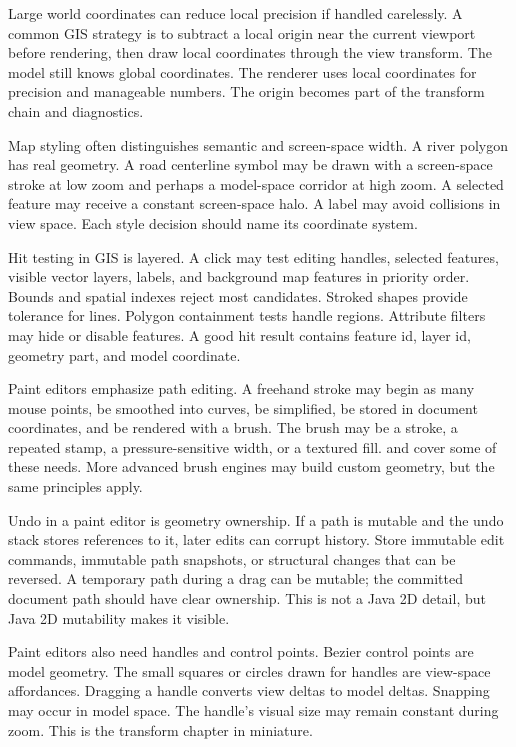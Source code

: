 Large world coordinates can reduce local precision if handled carelessly. A common GIS strategy is to subtract a local origin near the current viewport before rendering, then draw local coordinates through the view transform. The model still knows global coordinates. The renderer uses local coordinates for precision and manageable numbers. The origin becomes part of the transform chain and diagnostics.

Map styling often distinguishes semantic and screen-space width. A river polygon has real geometry. A road centerline symbol may be drawn with a screen-space stroke at low zoom and perhaps a model-space corridor at high zoom. A selected feature may receive a constant screen-space halo. A label may avoid collisions in view space. Each style decision should name its coordinate system.

Hit testing in GIS is layered. A click may test editing handles, selected features, visible vector layers, labels, and background map features in priority order. Bounds and spatial indexes reject most candidates. Stroked shapes provide tolerance for lines. Polygon containment tests handle regions. Attribute filters may hide or disable features. A good hit result contains feature id, layer id, geometry part, and model coordinate.

Paint editors emphasize path editing. A freehand stroke may begin as many mouse points, be smoothed into curves, be simplified, be stored in document coordinates, and be rendered with a brush. The brush may be a stroke, a repeated stamp, a pressure-sensitive width, or a textured fill.  and  cover some of these needs. More advanced brush engines may build custom geometry, but the same principles apply.

Undo in a paint editor is geometry ownership. If a path is mutable and the undo stack stores references to it, later edits can corrupt history. Store immutable edit commands, immutable path snapshots, or structural changes that can be reversed. A temporary path during a drag can be mutable; the committed document path should have clear ownership. This is not a Java 2D detail, but Java 2D mutability makes it visible.

Paint editors also need handles and control points. Bezier control points are model geometry. The small squares or circles drawn for handles are view-space affordances. Dragging a handle converts view deltas to model deltas. Snapping may occur in model space. The handle's visual size may remain constant during zoom. This is the transform chapter in miniature.

